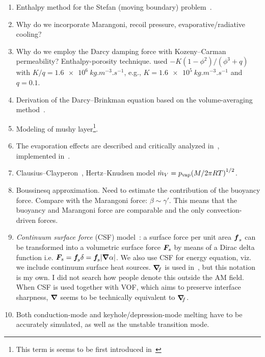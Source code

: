 \documentclass[final]{elsarticle} %
\newcommand{\evapor}[1]{{#1}_\text{vap}}
\newcommand{\gradf}[1]{\grad_{\!\! #1}}
\begin{document}
\begin{enumerate}
    \item Enthalpy method for the Stefan (moving boundary) problem~\cite{kamenomostskaja1961stefan, atthey1974finite, fedorenko1975difference, voller1981accurate}.
    \item Why do we incorporate Marangoni, recoil pressure, evaporative/radiative cooling?
    \item Why do we employ the Darcy damping force with Kozeny--Carman permeability?\cite{voller1987fixed, voller1987enthalpy} Enthalpy-porosity technique.
    \citet{voller1987fixed} used $-K(1-\phi^2)/(\phi^3+q)$
    with $K/q = \SI{1.6e6}{kg.m^{-3}.s^{-1}}$,
    e.g., $K = \SI{1.6e5}{kg.m^{-3}.s^{-1}}$ and $q=0.1$.
    \item Derivation of the Darcy--Brinkman equation based on the volume-averaging method~\cite{le2006interfacial}.
    \item Modeling of mushy layer\footnote{This term is seems to be first introduced in~\cite{tien1967heat}}.
    \item The evaporation effects are described and critically analyzed in~\cite{cook2019simulation}, implemented in~\cite{khairallah2016laser}.
    \item Clausius--Clayperon~\cite{klassen2014evaporation, cook2019simulation}, Hertz--Knudsen model $\dot{m}_V = \evapor{p}\qty(M/2\pi RT)^{1/2}$.
    \item Boussinesq approximation. Need to estimate the contribution of the buoyancy force. Compare with the Marangoni force: $\beta \sim \gamma'$. This means that the buoyancy and Marangoni force are comparable and the only convection-driven forces.
    \item \emph{Continuum surface force} (CSF) model~\cite{brackbill1992continuum}: a surface force per unit area $\vb*{f}_s$ can be transformed into a volumetric surface force $\vb*{F}_{\!s}$ by means of a Dirac delta function i.e. $\vb*{F}_{\!s} = \vb*{f}_{\!s}\delta = \vb*{f}_{\!s}|\grad\alpha|$.
    We also use CSF for energy equation, viz. we include continuum surface heat sources.
    $\gradf{f}$ is used in~\cite{brackbill1992continuum}, but this notation is my own. I did not search how people denote this outside the AM field.
    When CSF is used together with VOF, which aims to preserve interface sharpness, $\grad$ seems to be technically equivalent to $\gradf{f}$.
    \item Both conduction-mode and keyhole/depression-mode melting have to be
    accurately simulated, as well as the unstable transition mode.

\end{enumerate}
\end{document}
